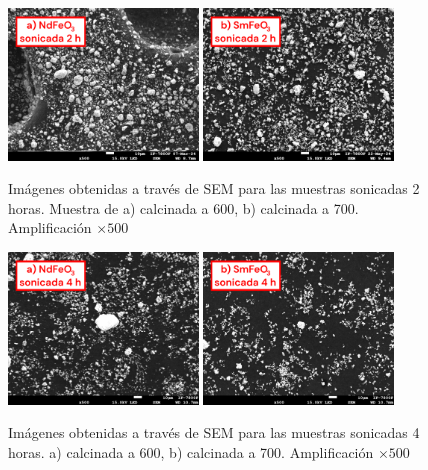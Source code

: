 \documentclass[../main.tex]{subfiles}
\begin{document}
\begin{figure}[H]
    \centering
    \includegraphics[width=0.45\textwidth]{fig/semneod2h.png}
    \quad
    \includegraphics[width=0.45\textwidth]{fig/semsama2h.png}
    \caption{Imágenes obtenidas a través de SEM para las muestras sonicadas 2 horas. Muestra de a) \neod{} calcinada a 600\gradoC{}, b) \sama{} calcinada a 700\gradoC{}. Amplificación $\times500$}
    \label{fig:resSEMsonicada2}
\end{figure}
\begin{figure}[H]
    \centering
    \includegraphics[width=0.45\textwidth]{fig/semneod4h.png}
    \quad
    \includegraphics[width=0.45\textwidth]{fig/semsama4h.png}
    \caption{Imágenes obtenidas a través de SEM para las muestras sonicadas 4 horas. a) \neod{} calcinada a 600\gradoC{}, b) \sama{} calcinada a 700\gradoC{}. Amplificación $\times500$}
    \label{fig:resSEMsonicada4}
\end{figure}
\end{document}

